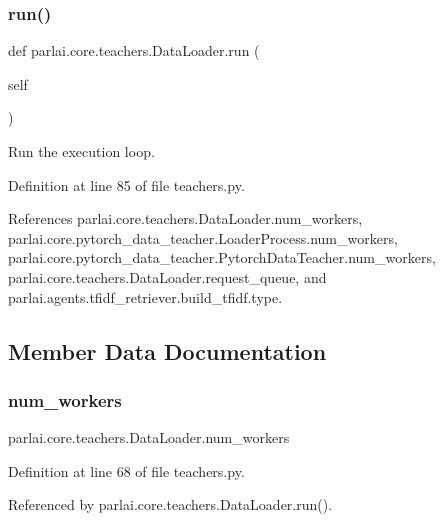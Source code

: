 \subsubsection{\texorpdfstring{run()}{run()}}
{\footnotesize\ttfamily def parlai.\+core.\+teachers.\+Data\+Loader.\+run (\begin{DoxyParamCaption}\item[{}]{self }\end{DoxyParamCaption})}

\begin{DoxyVerb}Run the execution loop.\end{DoxyVerb}
 

Definition at line 85 of file teachers.\+py.



References parlai.\+core.\+teachers.\+Data\+Loader.\+num\+\_\+workers, parlai.\+core.\+pytorch\+\_\+data\+\_\+teacher.\+Loader\+Process.\+num\+\_\+workers, parlai.\+core.\+pytorch\+\_\+data\+\_\+teacher.\+Pytorch\+Data\+Teacher.\+num\+\_\+workers, parlai.\+core.\+teachers.\+Data\+Loader.\+request\+\_\+queue, and parlai.\+agents.\+tfidf\+\_\+retriever.\+build\+\_\+tfidf.\+type.



\subsection{Member Data Documentation}
\mbox{\label{classparlai_1_1core_1_1teachers_1_1DataLoader_a223a0d846ce98840f8f3338611f94d34}} 
\subsubsection{\texorpdfstring{num\+\_\+workers}{num\_workers}}
{\footnotesize\ttfamily parlai.\+core.\+teachers.\+Data\+Loader.\+num\+\_\+workers}



Definition at line 68 of file teachers.\+py.



Referenced by parlai.\+core.\+teachers.\+Data\+Loader.\+run().

\mbox{\label{classparlai_1_1core_1_1teachers_1_1DataLoader_a960bf1159e437cfb304352213df50a8f}} 
